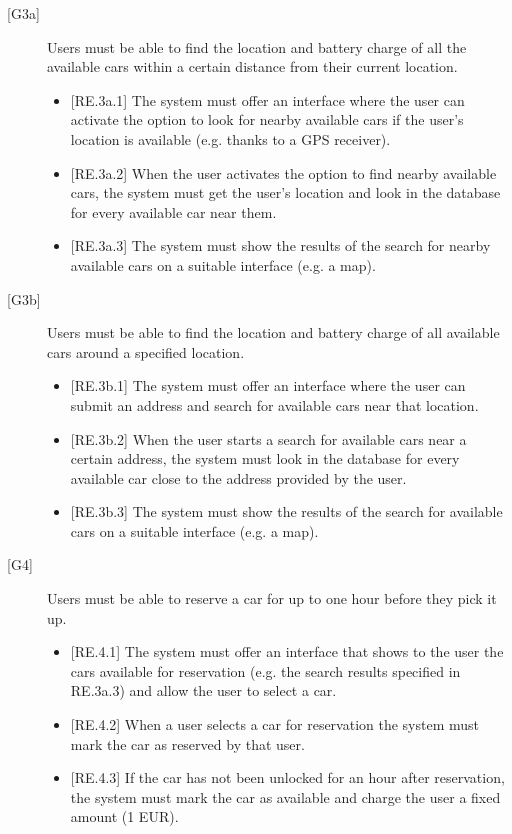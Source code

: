 \documentclass[english]{article}
\begin{document}
\begin{description}
\item[{[G3a]}]{Users must be able to find the location and battery charge of all the available cars within a certain distance from their current location.
\begin{itemize}
	\item{[RE.3a.1] The system must offer an interface where the user can activate the option to look for nearby available cars if the user’s location is available (e.g. thanks to a GPS receiver).}
	\item{[RE.3a.2] When the user activates the option to find nearby available cars, the system must get the user's location and look in the database for every available car near them.}
	\item{[RE.3a.3] The system must show the results of the search for nearby available cars on a suitable interface (e.g. a map).}
\end{itemize}
}

\item[{[G3b]}]{Users must be able to find the location and battery charge of all available cars around a specified location.
\begin{itemize}
	\item{[RE.3b.1] The system must offer an interface where the user can submit an address and search for available cars near that location.}
	\item{[RE.3b.2] When the user starts a search for available cars near a certain address, the system must look in the database for every available car close to the address provided by the user.}
	\item{[RE.3b.3] The system must show the results of the search for available cars on a suitable interface (e.g. a map).}
\end{itemize}
}

\item[{[G4]}]{Users must be able to reserve a car for up to one hour before they pick it up.
\begin{itemize}
	\item{[RE.4.1] The system must offer an interface that shows to the user the cars available for reservation (e.g. the search results specified in RE.3a.3) and allow the user to select a car.}
	\item{[RE.4.2] When a user selects a car for reservation the system must mark the car as reserved by that user.}
	\item{[RE.4.3] If the car has not been unlocked for an hour after reservation, the system must mark the car as available and charge the user a fixed amount (1 EUR).}
\end{itemize}
}


\end{description}
\end{document}
